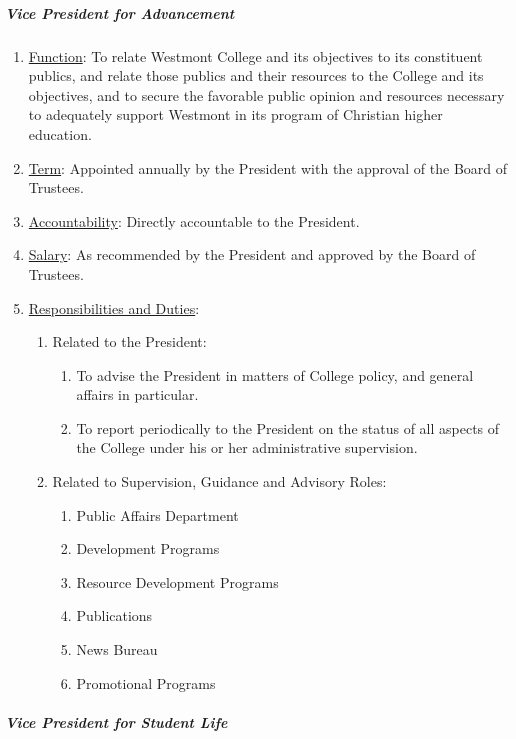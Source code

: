 \documentclass[letterpaper, 11pt]{article}
\begin{document}
				\subparagraph{Vice President for Advancement}
					\begin{enumerate}[label=\alph*)]
						\item{\underline{Function}:  To relate Westmont College and its objectives to its constituent publics, and relate those publics and their resources to the College and its objectives, and to secure the favorable public opinion and resources necessary to adequately support Westmont in its program of Christian higher education.}
						\item{\underline{Term}:  Appointed annually by the President with the approval of the Board of Trustees.}
						\item{\underline{Accountability}:  Directly accountable to the President.}
						\item{\underline{Salary}:  As recommended by the President and approved by the Board of Trustees.}
						\item{\underline{Responsibilities and Duties}:
							\begin{enumerate}[label=\arabic*)]
								\item{Related to the President:
									\begin{enumerate}[label=(\alph*)]
										\item{To advise the President in matters of College policy, and general affairs in particular.}
										\item{To report periodically to the President on the status of all aspects of the College under his or her administrative supervision.}
									\end{enumerate}
								}
								\item{Related to Supervision, Guidance and Advisory Roles:
									\begin{enumerate}[label=(\alph*)]
										\item{Public Affairs Department}
										\item{Development Programs}
										\item{Resource Development Programs}
										\item{Publications}
										\item{News Bureau}
										\item{Promotional Programs}
									\end{enumerate}
								}
							\end{enumerate}
						}
					\end{enumerate}
				\subparagraph{Vice President for Student Life}
\end{document}
